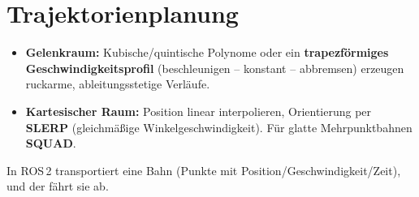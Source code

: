 \section{Trajektorienplanung}
\begin{itemize}
\item \textbf{Gelenkraum:} Kubische/quintische Polynome oder ein
  \textbf{trapezförmiges Geschwindigkeitsprofil} (beschleunigen -- konstant --
  abbremsen) erzeugen ruckarme, ableitungsstetige Verläufe.
\item \textbf{Kartesischer Raum:} Position linear interpolieren, Orientierung
  per \textbf{SLERP} (gleichmäßige Winkelgeschwindigkeit). Für glatte
  Mehrpunktbahnen \textbf{SQUAD}.
\end{itemize}
In ROS\,2 transportiert  eine Bahn
(Punkte mit Position/Geschwindigkeit/Zeit), und der
 fährt sie ab.
